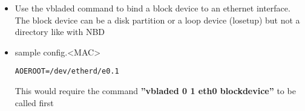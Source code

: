 \begin{itemize}
\item Use the vbladed command to bind a block device to an
      ethernet interface. The block device can be a disk
      partition or a loop device (losetup) but not a directory 
      like with NBD
\item sample config.<MAC>

\begin{Command}{12cm}
\begin{verbatim}
AOEROOT=/dev/etherd/e0.1
\end{verbatim}
\end{Command}

      This would require the command
      \textbf{''vbladed 0 1 eth0 blockdevice''}
      to be called first
\end{itemize}

